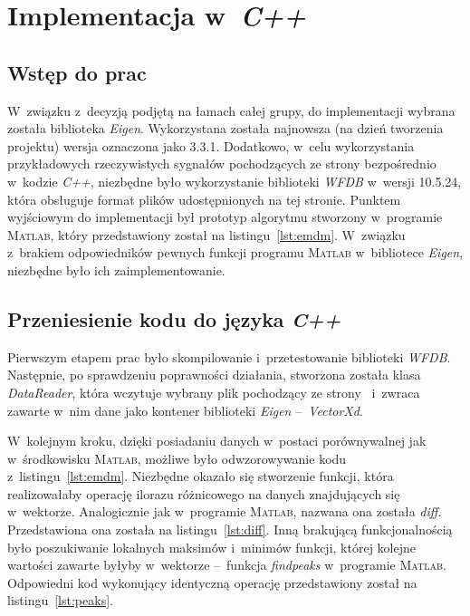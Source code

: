 \section{Implementacja w~\textit{C++}}

\subsection{Wstęp do prac}
\indent

W~związku z~decyzją podjętą na łamach całej grupy, do implementacji wybrana
została biblioteka \textit{Eigen}. Wykorzystana została najnowsza (na dzień
tworzenia projektu) wersja oznaczona jako 3.3.1. Dodatkowo, w~celu wykorzystania
przykładowych rzeczywistych sygnałów pochodzących ze strony \cite{EKG-DB}
bezpośrednio w~kodzie \textit{C++}, niezbędne było wykorzystanie biblioteki
\textit{WFDB} w~wersji 10.5.24, która obsługuje format plików udostępnionych na
tej stronie. Punktem wyjściowym do implementacji był prototyp algorytmu
stworzony w~programie \textsc{Matlab}, który przedstawiony został na
listingu~\ref{lst:emdm}. W~związku z~brakiem odpowiedników pewnych funkcji
programu \textsc{Matlab} w~bibliotece \textit{Eigen}, niezbędne było ich
zaimplementowanie.

\subsection{Przeniesienie kodu do języka \textit{C++}}
\indent

Pierwszym etapem prac było skompilowanie i~przetestowanie biblioteki
\textit{WFDB}. Następnie, po sprawdzeniu poprawności działania, stworzona
została klasa \textit{DataReader}, która wczytuje wybrany plik pochodzący ze
strony~\cite{EKG-DB} i~zwraca zawarte w~nim dane jako kontener biblioteki
\textit{Eigen} --~\textit{VectorXd}.

W~kolejnym kroku, dzięki posiadaniu danych w~postaci porównywalnej jak
w~środkowisku \textsc{Matlab}, możliwe było odwzorowywanie kodu
z~listingu~\ref{lst:emdm}. Niezbędne okazało się stworzenie funkcji, która
realizowałaby operację ilorazu różnicowego na danych znajdujących się
w~wektorze. Analogicznie jak w~programie \textsc{Matlab}, nazwana ona została
\textit{diff}. Przedstawiona ona została na listingu~\ref{lst:diff}. Inną
brakującą funkcjonalnością było poszukiwanie lokalnych maksimów i~minimów
funkcji, której kolejne wartości zawarte byłyby w~wektorze --~funkcja
\textit{findpeaks} w~programie \textsc{Matlab}. Odpowiedni kod wykonujący
identyczną operację przedstawiony został na listingu~\ref{lst:peaks}.

